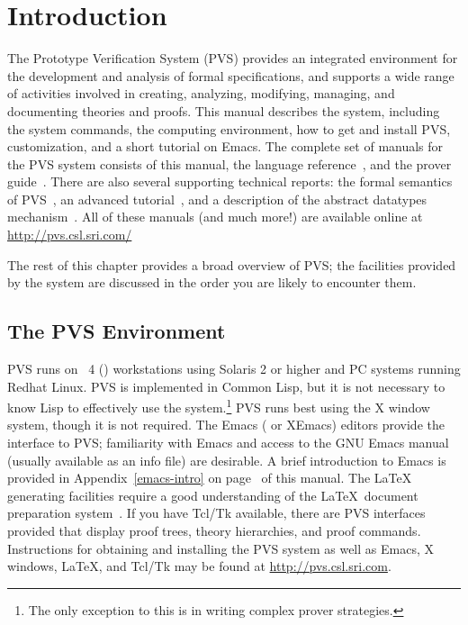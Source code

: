 \chapter{Introduction}
\label{introduction}

The Prototype Verification System (PVS) provides an integrated environment for the development and
analysis of formal specifications, and supports a wide range of activities
involved in creating, analyzing, modifying, managing, and documenting
theories and proofs.  This manual describes the system, including the
system commands, the computing environment, how to get and install PVS,
customization, and a short tutorial on Emacs.  The complete set of manuals
for the PVS system consists of this manual, the language
reference~\cite{PVS:language}, and the prover guide~\cite{PVS:prover}.
There are also several supporting technical reports: the formal semantics
of PVS~\cite{PVS:semantics}, an advanced
tutorial~\cite{Rushby&Stringer-Calvert95}, and a description of the
abstract datatypes mechanism~\cite{PVS-ADT:TR}.  All of these manuals (and
much more!) are available online at \url{http://pvs.csl.sri.com/}

The rest of this chapter provides a broad overview of PVS; the facilities
provided by the system are discussed in the order you are likely to
encounter them.

\section*{The PVS Environment}

PVS runs on \sun\ 4 (\sparc) workstations using Solaris 2 or higher and PC
systems running Redhat Linux.  PVS is implemented in Common
Lisp, but it is not necessary to know Lisp to
effectively use the system.\footnote{The only exception to this is in
writing complex prover strategies.}  PVS runs best using the X window
system, though it is not required.  The Emacs (\gnuemacs{}
or XEmacs) editors provide the interface to PVS; familiarity
with Emacs and access to the GNU Emacs manual~\cite{emacs20} (usually
available as an info file) are desirable.  A brief introduction to Emacs
is provided in Appendix~\ref{emacs-intro} on page~\pageref{emacs-intro} of
this manual.  The \LaTeX{} generating facilities
require a good understanding of the \LaTeX\ document preparation
system~\cite{latex2e}.  If you have Tcl/Tk available, there are PVS
interfaces provided that display proof trees, theory hierarchies, and
proof commands.  Instructions for obtaining and
installing the PVS system as well as Emacs, X
windows, \LaTeX, and Tcl/Tk may be found at \url{http://pvs.csl.sri.com}.


